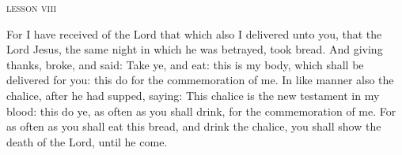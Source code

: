 \vspace{-9pt}
\begin{center}{\textsc{lesson viii}}\end{center}
\vspace{-5pt}

\begin{parcolumns}[rulebetween,colwidths={1=0.5\linewidth}]{2}
{For I have received of the Lord that which also I delivered unto you, that the Lord Jesus, the same night in which he was betrayed, took bread.
And giving thanks, broke, and said: Take ye, and eat: this is my body, which shall be delivered for you: this do for the commemoration of me.
In like manner also the chalice, after he had supped, saying: This chalice is the new testament in my blood: this do ye, as often as you shall drink, for the commemoration of me.
For as often as you shall eat this bread, and drink the chalice, you shall show the death of the Lord, until he come.}
\end{parcolumns}

